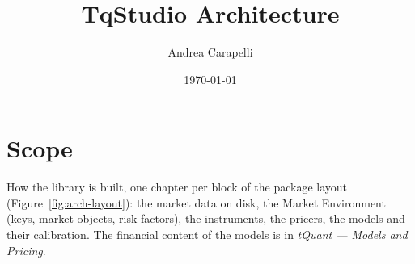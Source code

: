 \documentclass[11pt,a4paper]{article}
\title{TqStudio Architecture}
\author{Andrea Carapelli}
\date{\today}
\begin{document}
\maketitle
\tableofcontents
\clearpage

\section*{Scope}
How the library is built, one chapter per block of the package layout (Figure~\ref{fig:arch-layout}): the
market data on disk, the Market Environment (keys, market objects, risk factors), the instruments, the pricers,
the models and their calibration. The financial content of the models is in \emph{tQuant --- Models and Pricing}.








\end{document}
